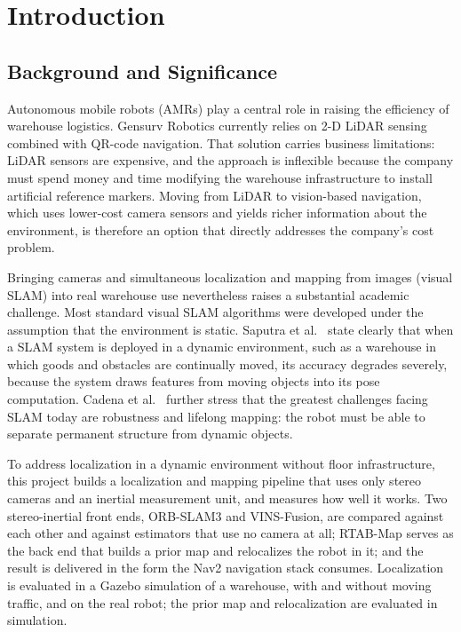 \chapter[INTRODUCTION]{Introduction}
\label{chap:introduction}

\section{Background and Significance}
\label{sec:background}

Autonomous mobile robots (AMRs) play a central role in raising the efficiency of
warehouse logistics. Gensurv Robotics currently relies on 2-D LiDAR sensing
combined with QR-code navigation. That solution carries business limitations:
LiDAR sensors are expensive, and the approach is inflexible because the company
must spend money and time modifying the warehouse infrastructure to install
artificial reference markers. Moving from LiDAR to vision-based navigation,
which uses lower-cost camera sensors and yields richer information about the
environment, is therefore an option that directly addresses the company's cost
problem.

Bringing cameras and simultaneous localization and mapping from images (visual
SLAM) into real warehouse use nevertheless raises a substantial academic
challenge. Most standard visual SLAM algorithms were developed under the
assumption that the environment is static. Saputra et al.~\cite{saputra2018}
state clearly that when a SLAM system is deployed in a dynamic environment, such
as a warehouse in which goods and obstacles are continually moved, its accuracy
degrades severely, because the system draws features from moving objects into
its pose computation. Cadena et al.~\cite{cadena2016} further stress that the
greatest challenges facing SLAM today are robustness and lifelong mapping: the
robot must be able to separate permanent structure from dynamic objects.

To address localization in a dynamic environment without floor
infrastructure, this project builds a localization and mapping pipeline that
uses only stereo cameras and an inertial measurement unit, and measures how
well it works. Two stereo-inertial front ends, ORB-SLAM3 and VINS-Fusion, are
compared against each other and against estimators that use no camera at all;
RTAB-Map serves as the back end that builds a prior map and relocalizes the
robot in it; and the result is delivered in the form the Nav2 navigation stack
consumes. Localization is evaluated in a Gazebo simulation of a warehouse, with
and without moving traffic, and on the real robot; the prior map and
relocalization are evaluated in simulation.

